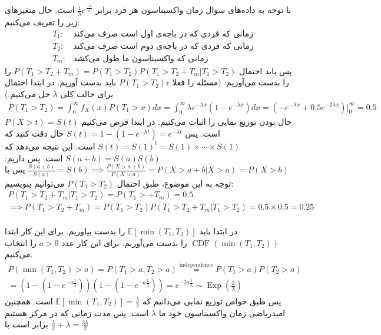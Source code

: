 \\
\\
با توجه به داده‌های سوال
زمان واکسیناسون هر فرد برابر
$\frac{1}{\lambda} e^{\frac{-x}{\lambda}}$
است. حال متغیر‌های زیر را تعریف می‌کنیم:
\[
    \begin{array}{ll}
        T_1: & \text{زمانی که فردی که در باجه‌ی اول است صرف می‌کند}\\
        T_2: & \text{زمانی که فردی که در باجه‌ی دوم است صرف می‌کند}\\
        T_m: & \text{زمانی که واکسیناسون ما طول می‌کشد}
    \end{array}
\]
پس باید احتمال
$P(T_1 > T_2 + T_m) = P(T_1 > T_2) P(T_1 > T_2 + T_m | T_1 > T_2)$
را باید بدست آوریم.
در ابتدا احتمال
$P(T_1 > T_2)$r
را بدست می‌آوریم:
(مسئله را فعلا برای حالت کلی $\lambda$ حل می‌کنیم.)
\begin{gather*}
    P(T_1 > T_2) = \int_{0}^{\infty} f_X(x) P(T_1 > x) dx = \int_{0}^{\infty} \lambda e^{-\lambda x} (1-e^{-\lambda x}) dx
    = (-e^{- \lambda x} + 0.5e^{-2 \lambda x}) \big |_0^{\infty} = 0.5
\end{gather*}
حال
بودن توزیع نمایی را اثبات می‌کنیم. در ابتدا فرض می‌کنیم
$P(X > t) = S(t)$
است. پس
$S(t) = 1 - (1 - e^{-\lambda t}) = e^{-\lambda t}$
حال دقت کنید که
$S(t) = S(1)^t = S(1) \times \cdots \times S(1)$
است. این نتیجه می‌دهد که
$S(a + b) = S(a)S(b)$
است. پس داریم:
$\frac{S(a+b)}{S(a)} = S(b) \implies \frac{P(X > a+b)}{P(X > a)} = P(X > a + b | X > a) = P(X > b)$
پس با توجه به این موضوع، طبق احتمال
$P(T_1 > T_2)$
می‌توانیم بنویسیم:
\begin{gather*}
    P(T_1 > T_2 + T_m | T_1 > T_2) = P(T_1 > + T_m) = 0.5\\
    \implies P(T_1 > T_2 + T_m) = P(T_1 > T_2) P(T_1 > T_2 + T_m | T_1 > T_2) = 0.5 \times 0.5 = 0.25
\end{gather*}
\\
در ابتدا باید
$\mathbb{E} [\min (T_1, T_2)]$
را بدست بیاوریم. برای این کار ابتدا
$\operatorname{CDF} (\min (T_1, T_2))$
را بدست می‌آوریم. برای این کار عدد
$a > 0$
را انتخاب می‌کنیم.
\begin{gather*}
    P(\min (T_1, T_2) > a) = P(T_1 > a, T_2 > a) \stackrel{\text{independence}}{=} P(T_1 > a) P(T_2 > a)\\=
    (1 - (1 - e^{-a\frac{1}{\lambda}})) (1 - (1 - e^{-a\frac{1}{\lambda}})) = e^{-2a\frac{1}{\lambda}}
    \sim \operatorname{Exp}(\frac{2}{\lambda})
\end{gather*}
پس طبق خواص توزیع نمایی می‌دانیم که
$\mathbb{E} [\min (T_1, T_2)] = \frac{\lambda}{2}$
است. همچنین امیدریاضی زمان واکسیناسون خود ما
$\lambda$
است. پس مدت زمانی که در مرکز هستیم برابر است با
$\frac{\lambda}{2} + \lambda = \frac{3\lambda}{2}$


